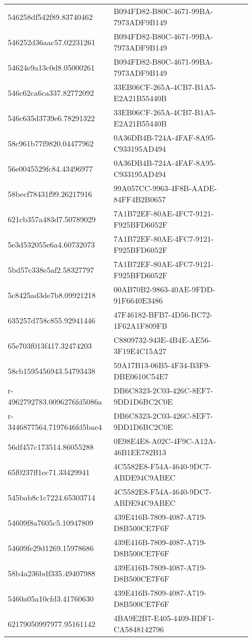 \begin{tabular}{ll}
546258df542f89.83740462 & B094FD82-B80C-4671-99BA-7973ADF9B149 \\
546252d36aac57.02231261 & B094FD82-B80C-4671-99BA-7973ADF9B149 \\
54624e9a13c0d8.05000261 & B094FD82-B80C-4671-99BA-7973ADF9B149 \\
546c62ca6ca337.82772092 & 33EB06CF-265A-4CB7-B1A5-E2A21B55440B \\
546c635d3739e6.78291322 & 33EB06CF-265A-4CB7-B1A5-E2A21B55440B \\
58c961b77f9820.04477962 & 0A36DB4B-724A-4FAF-8A95-C933195AD494 \\
56e0045529fc84.43496977 & 0A36DB4B-724A-4FAF-8A95-C933195AD494 \\
58becf78431f99.26217916 & 99A057CC-9963-4F8B-AADE-84FF4B2B0657 \\
621cb357a483d7.50789029 & 7A1B72EF-80AE-4FC7-9121-F925BFD6052F \\
5e3d532055e6a4.60732073 & 7A1B72EF-80AE-4FC7-9121-F925BFD6052F \\
5bd57c338e5af2.58327797 & 7A1B72EF-80AE-4FC7-9121-F925BFD6052F \\
5c8425ad3de7b8.09921218 & 00AB70B2-9863-40AE-9FDD-91F6640E3486 \\
635257d758c855.92941446 & 47F46182-BFB7-4D56-BC72-1F62A1F809FB \\
65e703f013f417.32474203 & C8809732-943E-4B4E-AE56-3F19E4C15A27 \\
58cb1595456943.54793438 & 59A17B13-06B5-4F34-B3F9-DBE0610C54E7 \\
r-4962792783.0096276fd5086a & DB6C8323-2C03-426C-8EF7-9DD1D6BC2C0E \\
r-3446877564.7197646fd5bae4 & DB6C8323-2C03-426C-8EF7-9DD1D6BC2C0E \\
56df457c173514.86055288 & 0E98E4E8-A02C-4F9C-A12A-46B1EE782B13 \\
65f0237ff1ec71.33429941 & 4C5582E8-F54A-4640-9DC7-ABDE94C9ABEC \\
545bab8c1c7224.65303714 & 4C5582E8-F54A-4640-9DC7-ABDE94C9ABEC \\
54609f8a7605c5.10947809 & 439E416B-7809-4087-A719-D8B500CE7F6F \\
54609fe29d1269.15978686 & 439E416B-7809-4087-A719-D8B500CE7F6F \\
58b4a236bdf335.49407988 & 439E416B-7809-4087-A719-D8B500CE7F6F \\
5460a05a10cfd3.41760630 & 439E416B-7809-4087-A719-D8B500CE7F6F \\
62179050997977.95161142 & 4BA9E2B7-E405-4409-BDF1-CA5848142796 \\

\end{tabular}
